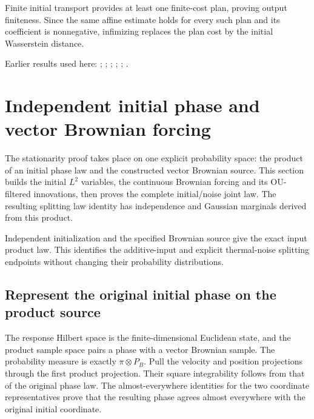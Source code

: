 \documentclass[11pt,a4paper]{report}
\begin{document}
Finite initial transport provides at least one finite-cost plan, proving output finiteness. Since the same affine estimate holds for every such plan and its coefficient is nonnegative, infimizing replaces the plan cost by the initial Wasserstein distance.



Earlier results used here: \cite[Section~3.17.1]{LangevinLean2026ULASC}; \cite[Section~3.17.12]{LangevinLean2026ULASC}; \cite[Section~3.17.3]{LangevinLean2026ULASC}; \cite[Section~3.17.4]{LangevinLean2026ULASC}; \cite[Section~3.18.2]{LangevinLean2026ULASC}; \cite[Section~3.18.4]{LangevinLean2026ULASC}.
\section{\texorpdfstring{Independent initial phase and vector Brownian forcing}{Independent initial phase and vector Brownian forcing}}
\label{proof-module-KineticLangevin-CanonicalProduct-lean}


The stationarity proof takes place on one explicit probability space: the product of an initial phase law and the constructed vector Brownian source. This section builds the initial \(L^{2}\) variables, the continuous Brownian forcing and its OU-filtered innovations, then proves the complete initial/\allowbreak{}noise joint law. The resulting splitting law identity has independence and Gaussian marginals derived from this product.



Independent initialization and the specified Brownian source give the exact input product law. This identifies the additive-input and explicit thermal-noise splitting endpoints without changing their probability distributions.

\subsection{\texorpdfstring{Represent the original initial phase on the product source}{Represent the original initial phase on the product source}}
\label{report-step-KineticLangevin-CanonicalProduct-lean-1}


The response Hilbert space is the finite-dimensional Euclidean state, and the product sample space pairs a phase with a vector Brownian sample. The probability measure is exactly \(\pi\otimes P_B\). Pull the velocity and position projections through the first product projection. Their square integrability follows from that of the original phase law. The almost-everywhere identities for the two coordinate representatives prove that the resulting phase agrees almost everywhere with the original initial coordinate.
\end{document}
